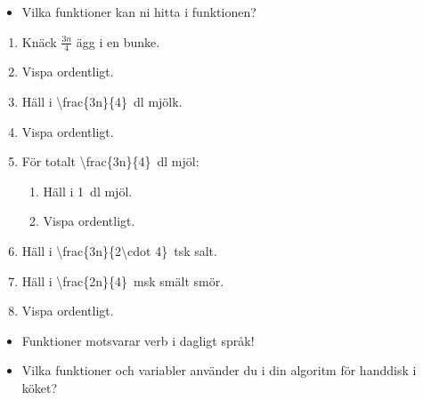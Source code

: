 \begin{frame}[fragile]
  \begin{exercise}
    \begin{itemize}
      \item Vilka funktioner kan ni hitta i funktionen?
    \end{itemize}
  \end{exercise}

  \begin{example}
    \begin{enumerate}
      \item \alert<2>{Knäck} \(\frac{3n}{4}\) ägg i en bunke.
      \item \alert<2>{Vispa} ordentligt.
      \item \alert<2>{Häll} i \SI{\frac{3n}{4}}{\deci\litre} mjölk.
      \item \alert<2>{Vispa} ordentligt.
      \item För totalt \SI{\frac{3n}{4}}{\deci\litre} mjöl:
        \begin{enumerate}
          \item \alert<2>{Häll} i \SI{1}{\deci\litre} mjöl.
          \item \alert<2>{Vispa} ordentligt.
        \end{enumerate}
      \item \alert<2>{Häll} i \SI{\frac{3n}{2\cdot 4}}{tsk} salt.
      \item \alert<2>{Häll} i \SI{\frac{2n}{4}}{msk} smält smör.
      \item \alert<2>{Vispa} ordentligt.
    \end{enumerate}
  \end{example}
\end{frame}

\begin{frame}
  \begin{remark}
    \begin{itemize}
      \item Funktioner motsvarar verb i dagligt språk!
    \end{itemize}
  \end{remark}
\end{frame}

\begin{frame}
  \begin{exercise}
    \begin{itemize}
      \item Vilka funktioner och variabler använder du i din algoritm för 
        handdisk i köket?
    \end{itemize}
  \end{exercise}
\end{frame}

